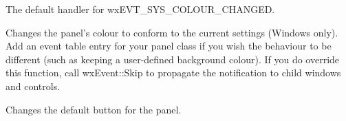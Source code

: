 
\label{wxpanelonsyscolourchanged}


The default handler for wxEVT\_SYS\_COLOUR\_CHANGED.




Changes the panel's colour to conform to the current settings (Windows only).
Add an event table entry for your panel class if you wish the behaviour
to be different (such as keeping a user-defined
background colour). If you do override this function, call wxEvent::Skip to
propagate the notification to child windows and controls.



\label{wxpanelsetdefaultitem}


Changes the default button for the panel.



